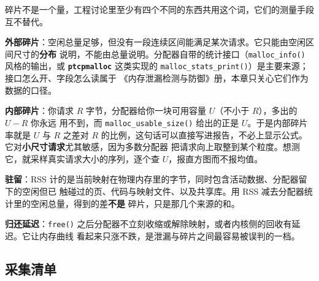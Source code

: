 \documentclass[12pt,a4paper,fontset=fandol]{ctexbook}
\newcommand{\Fn}[1]{\texttt{#1()}}
\newcommand{\Bk}{\discretionary{}{}{}}
\newcommand{\Lib}[1]{\textbf{\texttt{#1}}}
\newcommand{\Mx}[1]{\textsf{#1}}
\begin{document}
碎片不是一个量，工程讨论里至少有四个不同的东西共用这个词，它们的测量手段互不替代。

\textbf{外部碎片}：空闲总量足够，但没有一段连续区间能满足某次请求。它只能由空闲区间尺寸的\textbf{分布}
说明，不能由总量说明。分配器自带的统计接口（\Fn{malloc{\Bk}\_info} 风格的输出，或 \Lib{ptcpmalloc}
这类实现的 \Fn{malloc{\Bk}\_stats{\Bk}\_print}）是主要来源；接口怎么开、字段怎么读属于
《内存泄漏检测与防御》册，本章只关心它们作为数据的口径。

\textbf{内部碎片}：你请求 $R$ 字节，分配器给你一块可用容量 $U$（不小于 $R$），多出的 $U-R$ 你永远
用不到，而 \Fn{malloc{\Bk}\_usable{\Bk}\_size} 给出的正是 $U$。于是内部碎片率就是 $U$ 与 $R$ 之差对
$R$ 的比例，这句话可以直接写进报告，不必上显示公式。它对\textbf{小尺寸请求}尤其敏感，因为多数分配器
把请求向上取整到某个粒度。想测它，就采样真实请求大小的序列，逐个查 $U$，报直方图而不报均值。

\textbf{驻留}：\Mx{RSS} 计的是当前映射在物理内存里的字节，同时包含活动数据、分配器留下的空闲但已
触碰过的页、代码与映射文件、以及共享库。用 \Mx{RSS} 减去分配器统计里的空闲总量，得到的差\textbf{不是}
碎片，只是那几个来源的和。

\textbf{归还延迟}：\Fn{free} 之后分配器不立刻收缩或解除映射，或者内核侧的回收有延迟。它让内存曲线
看起来只涨不跌，是泄漏与碎片之间最容易被误判的一档。

\subsection{采集清单}
\label{sub:pm07-collect}
\end{document}
